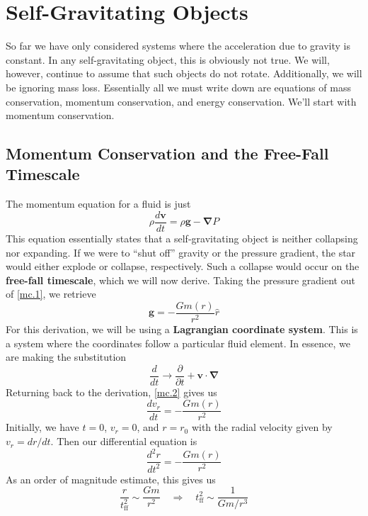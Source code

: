 \documentclass[10pt]{article}
\numberwithin{equation}{section}
\begin{document}
\section{Self-Gravitating Objects}
	So far we have only considered systems where the acceleration due to 
gravity is constant. In any self-gravitating object, this is obviously not 
true. We will, however, continue to assume that such objects do not rotate. 
Additionally, we will be ignoring mass loss. Essentially all we must write 
down are equations of mass conservation, momentum conservation, and energy 
conservation. We'll start with momentum conservation.
	\subsection{Momentum Conservation and the Free-Fall Timescale}
	The momentum equation for a fluid is just
	\begin{equation}
		\label{mc.1} \rho\frac{d\mathbf{v}}{dt}=\rho\mathbf{g}-\bm{\nabla}P
	\end{equation}
	This equation essentially states that a self-gravitating object is 
neither collapsing nor expanding. If we were to ``shut off'' gravity or the 
pressure gradient, the star would either explode or collapse, respectively. 
Such a collapse would occur on the \textbf{free-fall timescale}, which we 
will now derive. Taking the pressure gradient out of \eqref{mc.1}, we 
retrieve
	\begin{equation}
		\label{mc.2} \mathbf{g}=-\frac{Gm(r)}{r^2}\hat{r}
	\end{equation}
	For this derivation, we will be using a \textbf{Lagrangian coordinate 
system}. This is a system where the coordinates follow a particular fluid 
element. In essence, we are making the substitution
	\begin{equation}
		\label{mc.3} \frac{d}{dt}\to\frac{\partial}{\partial t}+\mathbf{v}
\cdot\bm{\nabla}
	\end{equation}
	Returning back to the derivation, \eqref{mc.2} gives us
	\begin{equation}
		\label{mc.4} \frac{dv_r}{dt}=-\frac{Gm(r)}{r^2}
	\end{equation}
	Initially, we have $t=0$, $v_r=0$, and $r=r_0$ with the radial velocity 
given by $v_r=dr/dt$. Then our differential equation is
	\begin{equation}
		\label{mc.5} \frac{d^2r}{dt^2}=-\frac{Gm(r)}{r^2}
	\end{equation}
	As an order of magnitude estimate, this gives us
	\begin{equation}
		\label{mc.6}\frac{r}{t_{\mathrm{ff}}^2}\sim\frac{Gm}{r^2}\quad 
\Rightarrow \quad t_{\mathrm{ff}}^2\sim\frac{1}{Gm/r^3}
	\end{equation}
\end{document}
